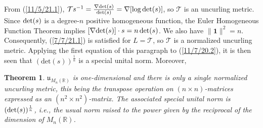 \documentclass{amsart}
\numberwithin{equation}{section}
\newtheorem{theorem}{Theorem}
\theoremstyle{definition}
\numberwithin{theorem}{section}
\begin{document}
From (\ref{11/5/21.1}), $\mathcal{T}s^{-1} = \frac{\nabla{\rm det}(s)}{{\rm det}(s)} = \nabla[\log{\rm det}(s)]$, so $\mathcal{T}$ is an uncurling metric.  Since ${\rm det}(s)$ is a degree-$n$ positive homogeneous function, the Euler Homogeneous Function Theorem implies $[\nabla{\rm det}(s)]\cdot s = n \,{\rm det}(s)$.  We also have $\|\mathbf{1}\|^2 = n$.  Consequently, (\ref{7/7/21.1}) is satisfied for $L=\mathcal{T}$, so $\mathcal{T}$ is a normalized uncurling metric.   Applying the first equation of this paragraph to (\ref{11/7/20.2}), it is then seen that $(\text{det}(s))^{\frac{1}{n}}$ is a special unital norm.
  Moreover,
 
 \begin{theorem} \label{4/8/22.1} $\mathfrak{u}_{M_n(\mathbb{R})}$ is one-dimensional and there is only a single normalized uncurling metric, this being the  transpose operation on $(n\times n)$-matrices expressed as an $(n^2\times n^2)$-matrix. The associated special unital norm is $({\rm det}(s))^{\frac{1}{n}}$, i.e., the usual norm raised to the power given by the reciprocal of the dimension of $M_n(\mathbb{R})$. \end{theorem}
\end{document}
